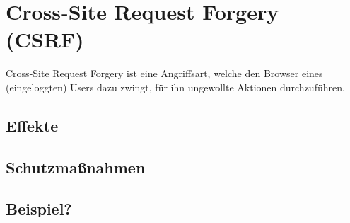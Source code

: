 \section{Cross-Site Request Forgery (CSRF)}
Cross-Site Request Forgery ist eine Angriffsart, welche den Browser eines (eingeloggten) Users dazu zwingt, f\"ur ihn ungewollte Aktionen durchzuf\"uhren.


\cite{hackingWebAppsBuch}


\subsection{Effekte}

\subsection{Schutzma{\ss}nahmen}

\subsection{Beispiel?}